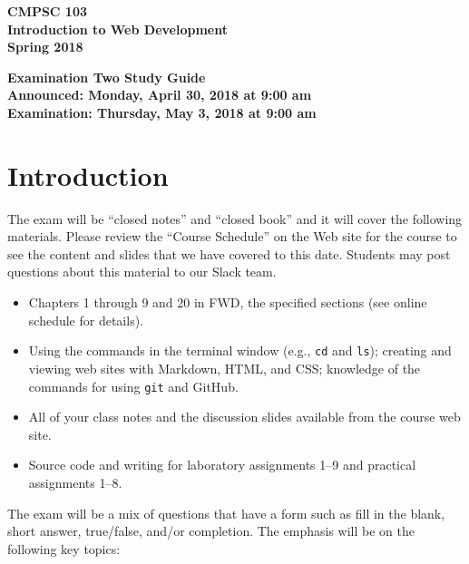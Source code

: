 \documentclass[11pt]{article}
\newcommand{\assignmentduedate}{May 3}
\newcommand{\assignmentassignedate}{April 30}
\newcommand{\assignmentnumber}{Two}
\newcommand{\labyear}{2018}
\newcommand{\assignedday}{Monday}
\newcommand{\dueday}{Thursday}
\newcommand{\labtime}{9:00 am}
\newcommand{\assigneddate}{Announced: \assignedday, \assignmentassignedate, \labyear{} at \labtime{}}
\newcommand{\duedate}{Examination: \dueday, \assignmentduedate, \labyear{} at \labtime{}}
\newcommand{\program}[1]{\lstinline{#1}}
\newcommand{\guidetitle}[1]
{
  \begin{center}
    \begin{center}
      \bf
      CMPSC 103\\Introduction to Web Development\\
      Spring 2018\\
      \medskip
    \end{center}
    \bf
    #1
  \end{center}
}
\begin{document}
\thispagestyle{empty}

\guidetitle{Examination \assignmentnumber{} Study Guide \\ \assigneddate{} \\ \duedate{}}

\section*{Introduction}

\noindent
The exam will be ``closed notes'' and ``closed book'' and it will cover the
following materials. Please review the ``Course Schedule'' on the Web site for
the course to see the content and slides that we have covered to this date.
Students may post questions about this material to our Slack team.

\begin{itemize}

  \itemsep 0in

  \item Chapters 1 through 9 and 20 in FWD, the specified sections (see online
    schedule for details).

  \item Using the commands in the terminal window (e.g., \program{cd} and
    \program{ls}); creating and viewing web sites with Markdown, HTML, and CSS;
    knowledge of the commands for using \program{git} and GitHub.

  \item All of your class notes and the discussion slides available from the
    course web site.

  \item Source code and writing for laboratory assignments 1--9 and practical
    assignments 1--8.

\end{itemize}

\noindent The exam will be a mix of questions that have a form such as fill in
the blank, short answer, true/false, and/or completion. The emphasis will be on
the following key topics:
\end{document}
